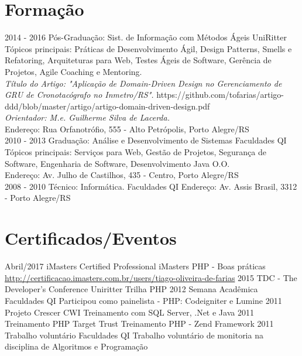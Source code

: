 \documentclass[]{friggeri-cv}
\begin{document}
\section{Formação}
\begin{entrylist}
  \entry
    {2014 - 2016}
    {Pós-Graduação: Sist. de Informação com Métodos Ágeis}
    {UniRitter}
    {Tópicos principais: Práticas de Desenvolvimento Ágil, Design Patterns, Smells e Refatoring, Arquiteturas para Web, Testes Ágeis de Software, Gerência de Projetos, Agile Coaching e Mentoring.\\
    \emph{Título do Artigo: "Aplicação de Domain-Driven Design no Gerenciamento de GRU de Cronotacógrafo no Inmetro/RS".} https://github.com/tofarias/artigo-ddd/blob/master/artigo/artigo-domain-driven-design.pdf \\
    \emph{Orientador: M.e. Guilherme Silva de Lacerda.}\\
    Endereço: Rua Orfanotrófio, 555 - Alto Petrópolis, Porto Alegre/RS\\}
  \entry
    {2010 - 2013}
    {Graduação: Análise e Desenvolvimento de Sistemas}
    {Faculdades QI}
    {Tópicos principais: Serviços para Web, Gestão de Projetos, Segurança de Software, Engenharia de Software, Desenvolvimento Java O.O.\\
    Endereço: Av. Julho de Castilhos, 435 - Centro, Porto Alegre/RS\\}    
  \entry
    {2008 - 2010}
    {Técnico: Informática.}
    {Faculdades QI}
    {Endereço: Av. Assis Brasil, 3312 - Porto Alegre/RS}
\end{entrylist}
\section{Certificados/Eventos}
\begin{entrylist}
  \entry
    {Abril/2017}
    {iMasters Certified Professional}
    {iMasters}
    {PHP - Boas práticas\\ \href{http://certificacao.imasters.com.br/users/tiago-oliveira-de-farias}{http://certificacao.imasters.com.br/users/tiago-oliveira-de-farias}}
    \entry
    {2015}
    {TDC - The Developer's Conference}
    {Uniritter}
    {Trilha PHP}
  \entry
    {2012}
    {Semana Acadêmica}
    {Faculdades QI}
    {Participou como painelista - PHP: Codeigniter e Lumine}
  \entry
    {2011}
    {Projeto Crescer}
    {CWI}
    {Treinamento com SQL Server, .Net e Java}
   \entry
    {2011}
    {Treinamento PHP}
    {Target Trust}
    {Treinamento PHP - Zend Framework}
   \entry
    {2011}
    {Trabalho voluntário}
    {Faculdades QI}
    {Trabalho voluntário de monitoria na disciplina de Algoritmos e Programação}
\end{entrylist}
\newpage
\end{document}
